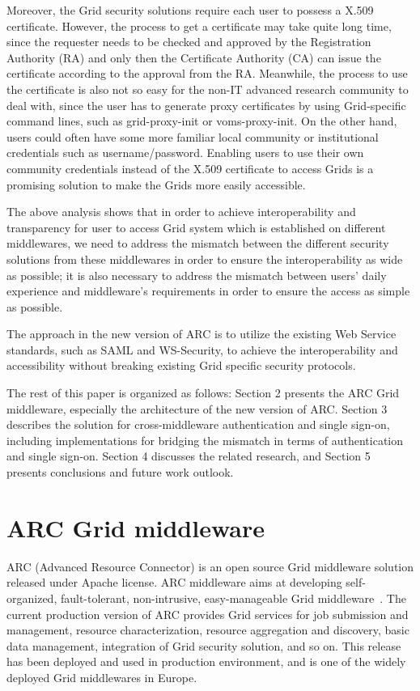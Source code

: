 \documentclass[twocolumn]{svjour3}         %
\begin{document}
Moreover, the Grid security solutions require each user to possess a X.509 certificate. However, the process to get a certificate may take quite long time, since the requester needs to be checked and approved by the Registration Authority (RA) and only then the Certificate Authority (CA) can issue the certificate according to the approval from the RA. Meanwhile, the process to use the certificate is also not so easy for the non-IT advanced research community to deal with, since the user has to generate proxy certificates by using Grid-specific command lines, such as grid-proxy-init or voms-proxy-init. On the other hand, users could often have some more familiar local community or institutional credentials such as username/password. Enabling users to use their own community credentials instead of the X.509 certificate to access Grids is a promising solution to make the Grids more easily accessible.

The above analysis shows that in order to achieve interoperability and transparency for user to access Grid system which is established on different middlewares, we need to address the mismatch between the different security solutions from these middlewares in order to ensure the interoperability as wide as possible; it is also necessary to address the mismatch between users' daily experience and middleware's requirements in order to ensure the access as simple as possible.

The approach in the new version of ARC is to utilize the existing Web Service standards, such as SAML and WS-Security, to achieve the interoperability and accessibility without breaking existing Grid specific security protocols.

The rest of this paper is organized as follows: Section 2 presents the ARC Grid middleware, especially the architecture of the new version of ARC. Section 3 describes the solution for cross-middleware authentication and single sign-on, including implementations for bridging the mismatch in terms of authentication and single sign-on. Section 4 discusses the related research, and Section 5 presents conclusions and future work outlook.

\section{ARC Grid middleware}
\label{sec:arcmiddleware}
ARC (Advanced Resource Connector) is an open source Grid middleware solution released under Apache license. ARC middleware aims at developing self-organized, fault-tolerant, non-intrusive, easy-manageable Grid middleware~\cite{MEllert07}. The current production version of ARC provides Grid services for job submission and management, resource characterization, resource aggregation and discovery, basic data management, integration of Grid security solution, and so on. This release has been deployed and used in production environment, and is one of the widely deployed Grid middlewares in Europe.
\end{document}
